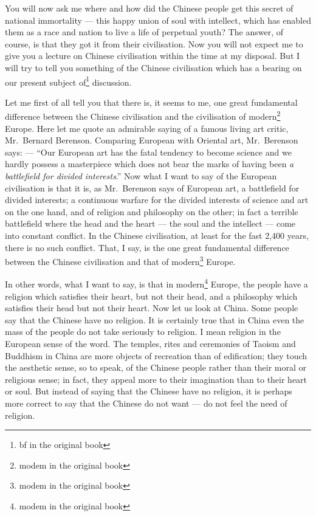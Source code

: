 You will now ask me where and how did the Chinese people get this secret of national immortality --- this happy union of soul with intellect, which has enabled them as a race and nation to live a life of perpetual youth?
The answer, of course, is that they got it from their civilisation.
Now you will not expect me to give you a lecture on Chinese civilisation within the time at my disposal.
But I will try to tell you something of the Chinese civilisation which has a bearing on our present subject of\footnote{bf in the original book} discussion.

Let me first of all tell you that there is, it seems to me, one great fundamental difference between the Chinese civilisation and the civilisation of modern\footnote{modem in the original book} Europe.
Here let me quote an admirable saying of a famous living art critic, Mr.~Bernard Berenson. 
Comparing European with Oriental art, Mr.~Berenson says: --- ``Our European art has the fatal tendency to become science and we hardly possess a masterpiece which does not bear the marks of having been \emph{a battlefield for divided interests}.''
Now what I want to say of the European civilisation is that it is, as Mr.~Berenson says of European art, a battlefield for divided interests; a continuous warfare for the divided interests of science and art on the one hand, and of religion and philosophy on the other; in fact a terrible battlefield where the head and the heart --- the soul and the intellect --- come into constant conflict.
In the Chinese civilisation, at least for the fast 2,400 years, there is no such conflict.
That, I say, is the one great fundamental difference between the Chinese civilisation and that of modern\footnote{modem in the original book} Europe.

In other words, what I want to say, is that in modern\footnote{modem in the original book} Europe, the people have a religion which satisfies their heart, but not their head, and a philosophy which satisfies their head but not their heart.
Now let us look at China.
Some people say that the Chinese have no religion.
It is certainly true that in China even the mass of the people do not take seriously to religion.
I mean religion in the European sense of the word.
The temples, rites and ceremonies of Taoism and Buddhism in China are more objects of recreation than of edification; they touch the aesthetic sense, so to speak, of the Chinese people rather than their moral or religious sense; in fact, they appeal more to their imagination than to their heart or soul.
But instead of saying that the Chinese have no religion, it is perhaps more correct to say that the Chinese do not want --- do not feel the need of religion.

